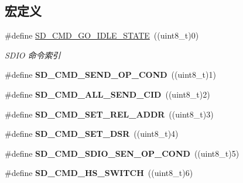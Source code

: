 \subsection*{宏定义}
\begin{DoxyCompactItemize}
\item 
\#define \hyperlink{group__sd__card_ga9d34df51b7f169e0be94fea97d0c1639}{S\+D\+\_\+\+C\+M\+D\+\_\+\+G\+O\+\_\+\+I\+D\+L\+E\+\_\+\+S\+T\+A\+TE}~((uint8\+\_\+t)0)\hypertarget{group__sd__card_ga9d34df51b7f169e0be94fea97d0c1639}{}\label{group__sd__card_ga9d34df51b7f169e0be94fea97d0c1639}

\begin{DoxyCompactList}\small\item\em S\+D\+IO 命令索引 \end{DoxyCompactList}\item 
\#define {\bfseries S\+D\+\_\+\+C\+M\+D\+\_\+\+S\+E\+N\+D\+\_\+\+O\+P\+\_\+\+C\+O\+ND}~((uint8\+\_\+t)1)\hypertarget{group__sd__card_ga74eabc4acadc80ad0242d52942c8d76a}{}\label{group__sd__card_ga74eabc4acadc80ad0242d52942c8d76a}

\item 
\#define {\bfseries S\+D\+\_\+\+C\+M\+D\+\_\+\+A\+L\+L\+\_\+\+S\+E\+N\+D\+\_\+\+C\+ID}~((uint8\+\_\+t)2)\hypertarget{group__sd__card_ga3d9d3a1da54a30d81e1d2a9c6a2d9b4f}{}\label{group__sd__card_ga3d9d3a1da54a30d81e1d2a9c6a2d9b4f}

\item 
\#define {\bfseries S\+D\+\_\+\+C\+M\+D\+\_\+\+S\+E\+T\+\_\+\+R\+E\+L\+\_\+\+A\+D\+DR}~((uint8\+\_\+t)3)\hypertarget{group__sd__card_gaa7e0f4e84001656eac62b41179376a25}{}\label{group__sd__card_gaa7e0f4e84001656eac62b41179376a25}

\item 
\#define {\bfseries S\+D\+\_\+\+C\+M\+D\+\_\+\+S\+E\+T\+\_\+\+D\+SR}~((uint8\+\_\+t)4)\hypertarget{group__sd__card_ga89e890726a09716bb1a5c6ef6d0d3d90}{}\label{group__sd__card_ga89e890726a09716bb1a5c6ef6d0d3d90}

\item 
\#define {\bfseries S\+D\+\_\+\+C\+M\+D\+\_\+\+S\+D\+I\+O\+\_\+\+S\+E\+N\+\_\+\+O\+P\+\_\+\+C\+O\+ND}~((uint8\+\_\+t)5)\hypertarget{group__sd__card_ga5f4e5909200ef9eb61ac2252f4099360}{}\label{group__sd__card_ga5f4e5909200ef9eb61ac2252f4099360}

\item 
\#define {\bfseries S\+D\+\_\+\+C\+M\+D\+\_\+\+H\+S\+\_\+\+S\+W\+I\+T\+CH}~((uint8\+\_\+t)6)\hypertarget{group__sd__card_ga88fb9fd3b2c9fea10b79da9a569d4471}{}\label{group__sd__card_ga88fb9fd3b2c9fea10b79da9a569d4471}


\end{DoxyCompactItemize}
